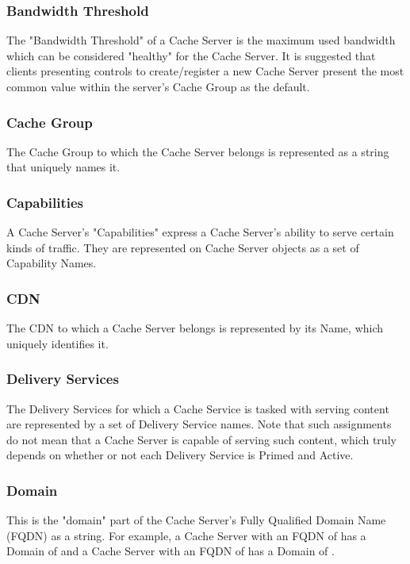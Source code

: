 \subsubsection{Bandwidth Threshold}
The "Bandwidth Threshold" of a Cache Server is the maximum used bandwidth which
can be considered "healthy" for the Cache Server. It is suggested that clients
presenting controls to create/register a new Cache Server present the most
common value within the server's Cache Group as the default.

\subsubsection{Cache Group}
The Cache Group to which the Cache Server belongs is represented as a string
that uniquely names it.

\subsubsection{Capabilities}
A Cache Server's "Capabilities" express a Cache Server's ability to serve
certain kinds of traffic. They are represented on Cache Server objects as a set
of Capability Names.

\subsubsection{CDN}
The CDN to which a Cache Server belongs is represented by its Name, which
uniquely identifies it.

\subsubsection{Delivery Services}
The Delivery Services for which a Cache Service is tasked with serving content
are represented by a set of Delivery Service names. Note that such assignments
do not mean that a Cache Server is capable of serving such content, which truly
depends on whether or not each Delivery Service is Primed and Active.

\subsubsection{Domain}
This is the "domain" part of the Cache Server's Fully Qualified Domain Name
(FQDN) as a string. For example, a Cache Server with an FQDN of
 has a Domain of  and a Cache Server with an FQDN of
 has a Domain of .

